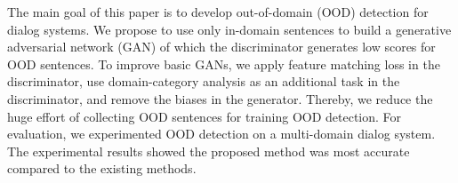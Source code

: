 The main goal of this paper is to develop out-of-domain (OOD) detection for dialog systems. We propose to use only in-domain sentences to build a generative adversarial network (GAN) of which the discriminator generates low scores for OOD sentences. To improve basic GANs, we apply feature matching loss in the discriminator, use domain-category analysis as an additional task in the discriminator, and remove the biases in the generator. Thereby, we reduce the huge effort of collecting OOD sentences for training OOD detection. For evaluation, we experimented OOD detection on a multi-domain dialog system. The experimental results showed the proposed method was most accurate compared to the existing methods.
